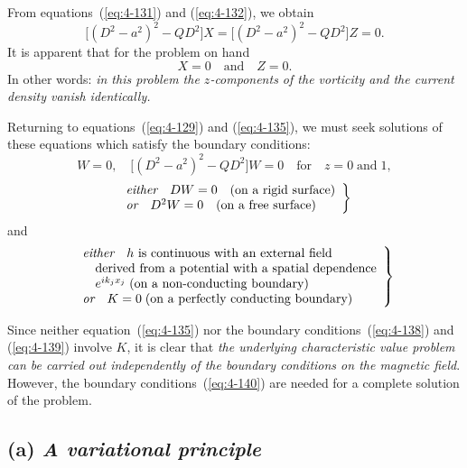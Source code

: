 From equations~(\ref{eq:4-131}) and (\ref{eq:4-132}), we obtain
\begin{equation}
\label{eq:4-136}
\bigl[(D^2-a^2)^2-QD^2\bigr]X = \bigl[(D^2-a^2)^2-QD^2\bigr]Z = 0.
\end{equation}
It is apparent that for the problem on hand
\begin{equation}
\label{eq:4-137}
X = 0 \quad\text{and}\quad Z = 0.
\end{equation}
In other words: \emph{in this problem the $z$-components of the vorticity and the current density vanish identically.}

Returning to equations~(\ref{eq:4-129}) and (\ref{eq:4-135}), we must seek solutions of these equations which satisfy the boundary conditions:
\begin{equation}
\label{eq:4-138}
W = 0, \quad \bigl[(D^2-a^2)^2-QD^2\bigr]W = 0 \quad \text{for}\quad z = 0\;\text{and}\;1,
\end{equation}
\begin{equation}
\label{eq:4-139}
\left.\begin{array}{l}
\emph{either}\quad DW = 0 \quad\text{(on a rigid surface)}\\
\emph{or}\quad D^2 W = 0 \quad\text{(on a free surface)}
\end{array}\right\}
\end{equation}
and
\begin{equation}
\label{eq:4-140}
\left.\begin{array}{l}
\emph{either}\quad\text{$\mathbf{h}$ is continuous with an external field}\\
\quad\text{derived from a potential with a spatial dependence}\\
\quad e^{ik_j x_j}\;\text{(on a non-conducting boundary)}\\
\emph{or}\quad K = 0\;\text{(on a perfectly conducting boundary)}
\end{array}\right\}
\end{equation}

Since neither equation~(\ref{eq:4-135}) nor the boundary conditions~(\ref{eq:4-138}) and (\ref{eq:4-139}) involve $K$, it is clear that \emph{the underlying characteristic value problem can be carried out independently of the boundary conditions on the magnetic field}. However, the boundary conditions~(\ref{eq:4-140}) are needed for a complete solution of the problem.

\subsection*{(a) \emph{A variational principle}}

